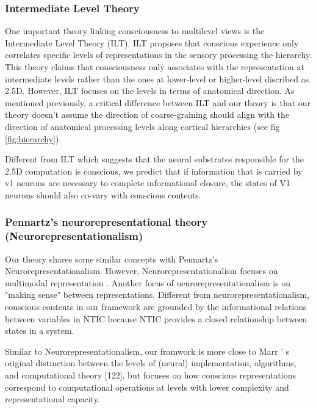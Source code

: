 \documentclass[utf8]{article}
\begin{document}
			\subsubsection{Intermediate Level Theory} \label{IntermediateLevelTheory}
                One important theory linking consciousness to multilevel views is the Intermediate Level Theory (ILT). ILT proposes that conscious experience only correlates specific levels of representations in the sensory processing the hierarchy. This theory claims that consciousness only associates with the representation at intermediate levels rather than the ones at lower-level or higher-level discribed as 2.5D. However, ILT focuses on the levels in terms of anatomical direction. As mentioned previously, a critical difference between ILT and our theory is that our theory doesn't assume the direction of coarse-graining should align with the direction of anatomical processing levels along cortical hierarchies (see fig \ref{fig:hierarchy}).
                
                Different from ILT which suggests that the neural substrates responsible for the 2.5D computation is conscious, we predict that if information that is carried by v1 neurons are necessary to complete informational closure, the states of V1 neurons should also co-vary with conscious contents. 
				
			\subsubsection{Pennartz's neurorepresentational theory (Neurorepresentationalism)}
			    Our theory shares some similar concepts with Pennartz's Neurorepresentationalism. However, Neurorepresentationalism focuses on multimodal representation \cite{pennartz2018consciousness,pennartz2015brain}. Another focus of neurorepresentationalism is on "making sense" between representations. Different from neurorepresentationalism, conscious contents in our framework are grounded by the informational relations between variables in NTIC because NTIC provides a closed relationship between states in a system. 
			    
			    Similar to Neurorepresentationalism, our framwork is more close to Marr ’ s original distinction between the levels of (neural) implementation, algorithms, and computational theory [122], but focuses on how conscious representations correspond to computational operations at levels with lower complexity and representational capacity.\cite{pennartz2018consciousness,pennartz2015brain}
			    
\end{document}
